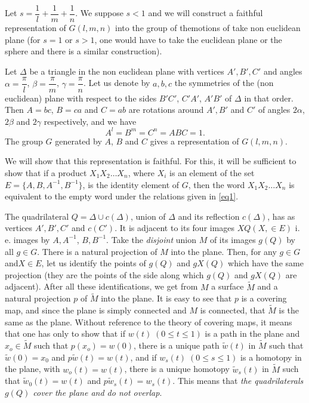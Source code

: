  Let $s = \dfrac{1}{l} + \dfrac{1}{m} + \dfrac{1}{n}$. We suppose $s <
 1$ and we will construct a faithful representation of $G(l, m, n)$
 into the group of the\pageoriginale motions of take non euclidean
 plane (for $s = 
 1$ or $s > 1$, one would have to take the euclidean plane or the
 sphere and there is a similar construction). 
 
 Let $\Delta$ be a triangle in the non euclidean plane with vertices
 $A', B', C'$ and angles $\alpha = \dfrac{\pi}{l}$, $\beta =
 \dfrac{\pi}{m}$, $\gamma = \dfrac{\pi}{n}$. Let us denote by $a,
 b, c$ the symmetries of the (non euclidean) plane with  respect to
 the sides $B' C'$, $C' A'$, $A' B'$ of $\Delta$ in that order. Then
 $A= bc$, $B = ca$ and $C = ab$ are rotations around $A', B'$ and
 $C'$ of angles $2\alpha$, $2\beta$ and $2\gamma$ respectively, and we
 have 
 $$
 A^l = B^m = C^n = ABC = 1. 
 $$
 The group  $G$ generated by $A$, $B$ and $C$ gives a representation
 of $G(l,m,n)$. 
 
 We will show that this representation is faithful. For this, it will
 be sufficient to show that if a product $X_1 X_2 \ldots X_n$, where
 $X_i$ is an element of the set $E = \{ A, B, A^{-1}, B^{-1} \}$, is
 the identity element of $G$, then the word $X_1 X_2 \ldots X_n$ is
 equivalent to the empty word under the relations given in \eqref{eq1}.  
 
 The quadrilateral $Q = \Delta \cup c (\Delta)$, union of $\Delta$ and
 its  reflection $c(\Delta)$, has as vertices $A', B', C'$ and
 $c(C')$. It is adjacent to its four images $XQ (X, \in E)$
 i. e. images by $A, A^{-1}$, $B, B^{-1}$. Take the
 \textit{disjoint} union $M$ of its images $g(Q)$ by all $g \in
 G$. There is a natural projection of $M$ into the plane. Then, for
 any $g \in G$ and\pageoriginale $X \in E$, let us identify the
 points of $g(Q)$ 
 and $gX(Q)$ which have the same projection (they are the points of
 the side along which $g(Q)$ and $gX(Q)$ are adjacent). After all
 these identifications, we get from $M$ a surface $\tilde{M}$ and a
 natural projection $p$ of $\tilde{M}$ into the plane. It is easy to
 see that $p$ is a covering map, and since the plane is simply
 connected and $M$ is connected, that $\tilde{M}$ is the same as the
 plane. Without reference to the theory of covering maps, it means
 that one has only to show that if $w(t) \; (0 \leq t \leq 1)$ is a path
 in the plane and $x_o \in \tilde{M}$ such that $p(x_o) = w(0)$, there
 is a unique path $\tilde{w} (t)$ in $\tilde{M}$ such that $\tilde{w}
 (0) = x_0$ and $p \tilde{w} (t) = w(t)$, and if $w_s (t)\; (0 \leq s
 \leq 1)$ is a homotopy in the plane, with $w_o (t) = w(t)$, there is
 a unique homotopy $\tilde{w}_s (t)$ in $\tilde{M}$ such that
 $\tilde{w}_0 (t) = w(t)$ and $p \tilde{w}_s (t) = w_s (t)$. This
 means that \textit{the quadrilaterals $g(Q)$ cover the plane and do 
   not overlap}. 
 
